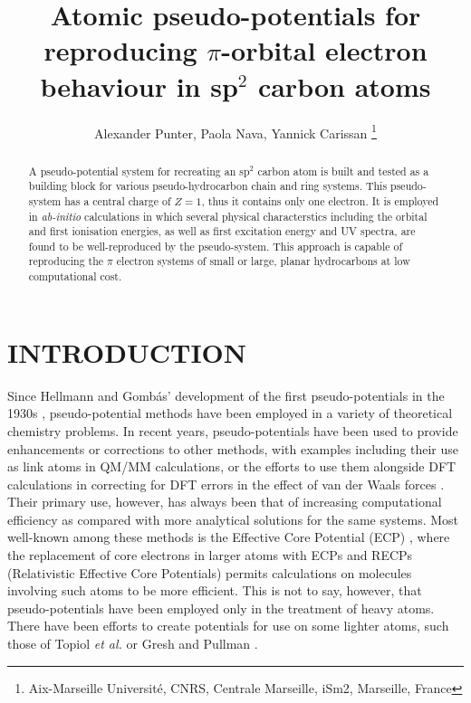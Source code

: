 \documentclass[12pt]{article}
\title{Atomic pseudo-potentials for reproducing $\pi$-orbital electron behaviour in sp$^2$ carbon atoms}
\author{Alexander Punter, Paola Nava, Yannick Carissan \thanks{Aix-Marseille Universit\'e, CNRS, Centrale Marseille, iSm2, Marseille, France}}
\begin{document}
\maketitle


\begin{abstract}
A pseudo-potential system for recreating an sp\(^{2}\) carbon atom is built and tested as a building block for various pseudo-hydrocarbon chain and ring systems.  
This pseudo-system has a central charge of $Z=1$, thus it contains only one electron. It is employed in \textsl{ab-initio} calculations in which several physical characterstics including the orbital and first ionisation energies, as well as first excitation energy and UV spectra, are found to be well-reproduced by the pseudo-system. This approach is capable of reproducing the $\pi$ electron systems of small or large, planar hydrocarbons at low computational cost.
\end{abstract}

\clearpage

  \makeatletter
  \renewcommand\@biblabel[1]{#1.}
  \makeatother



\renewcommand{\baselinestretch}{1.5}
\normalsize


\clearpage

\section*{\sffamily \Large INTRODUCTION}

Since Hellmann and Gomb\'as' development of the first pseudo-potentials in the 1930s \cite{hellmann_1935, gombas_1935}, pseudo-potential methods have been employed in a variety of theoretical chemistry problems. In recent years, pseudo-potentials have been used to provide enhancements or corrections to other methods, with examples including their use as link atoms in QM/MM calculations, or the efforts to use them alongside DFT calculations in correcting for DFT errors in the effect of van der Waals forces \cite{dilabio_2008}. Their primary use, however, has always been that of increasing computational efficiency as compared with more analytical solutions for the same systems. Most well-known among these methods is the Effective Core Potential (ECP) \cite{dolg_2000}, where the replacement of core electrons in larger atoms with ECPs and RECPs (Relativistic Effective Core Potentials) permits calculations on molecules involving such atoms to be more efficient. This is not to say, however, that pseudo-potentials have been employed only in the treatment of heavy atoms. There have been efforts to create potentials for use on some lighter atoms, such those of Topiol \emph{et al.} or Gresh and Pullman \cite{topiol_1976, gresh_1978}. 
\end{document}

